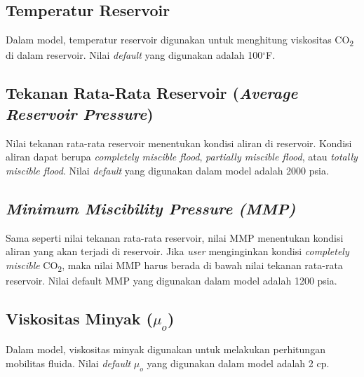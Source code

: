 \documentclass[
]{book}
\begin{document}
\hypertarget{temperatur-reservoir}{%
\subsection{Temperatur Reservoir}\label{temperatur-reservoir}}

Dalam model, temperatur reservoir digunakan untuk menghitung viskositas CO\textsubscript{2} di dalam reservoir. Nilai \emph{default} yang digunakan adalah 100\(^\circ\)F.

\hypertarget{tekanan-rata-rata-reservoir-average-reservoir-pressure}{%
\subsection{\texorpdfstring{Tekanan Rata-Rata Reservoir (\emph{Average Reservoir Pressure})}{Tekanan Rata-Rata Reservoir (Average Reservoir Pressure)}}\label{tekanan-rata-rata-reservoir-average-reservoir-pressure}}

Nilai tekanan rata-rata reservoir menentukan kondisi aliran di reservoir. Kondisi aliran dapat berupa \emph{completely miscible flood}, \emph{partially miscible flood}, atau \emph{totally miscible flood}. Nilai \emph{default} yang digunakan dalam model adalah 2000 psia.

\hypertarget{minimum-miscibility-pressure-mmp}{%
\subsection{\texorpdfstring{\emph{Minimum Miscibility Pressure (MMP)}}{Minimum Miscibility Pressure (MMP)}}\label{minimum-miscibility-pressure-mmp}}

Sama seperti nilai tekanan rata-rata reservoir, nilai MMP menentukan kondisi aliran yang akan terjadi di reservoir. Jika \emph{user} menginginkan kondisi \emph{completely miscible} CO\textsubscript{2}, maka nilai MMP harus berada di bawah nilai tekanan rata-rata reservoir. Nilai default MMP yang digunakan dalam model adalah 1200 psia.

\hypertarget{viskositas-minyak-mu_o}{%
\subsection{\texorpdfstring{Viskositas Minyak (\(\mu_o\))}{Viskositas Minyak (\textbackslash mu\_o)}}\label{viskositas-minyak-mu_o}}

Dalam model, viskositas minyak digunakan untuk melakukan perhitungan mobilitas fluida. Nilai \emph{default} \(\mu_o\) yang digunakan dalam model adalah 2 cp.
\end{document}
